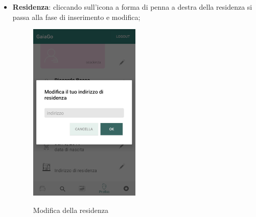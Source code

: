 \begin{itemize}
\item \textbf{Residenza}: cliccando sull'icona a forma di penna a destra della residenza si passa alla fase di inserimento e modifica;
\begin{figure}[H] 
	\centering 
	\includegraphics[width=0.5\textwidth]{res/images/modifica_residenza.png}\\
	\caption{Modifica della residenza}
	\label{modifiresidenza}
\end{figure}
\pagebreak
\end{itemize}
	
